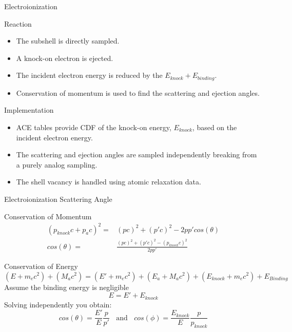 \documentclass{beamer}
\begin{document}
\begin{frame}{Electroionization}

  \begin{block}{Reaction}
    \begin{itemize}
      \item The subshell is directly sampled.
      \item A knock-on electron is ejected.
      \item The incident electron energy is reduced by the $E_{knock} + E_{binding}$.
      \item Conservation of momentum is used to find the scattering and ejection angles.
      \end{itemize}
  \end{block}  
      
  \begin{block}{Implementation}
    \begin{itemize}
      \item ACE tables provide CDF of the knock-on energy, $E_{knock}$, based on the incident electron energy.
      \item The scattering and ejection angles are sampled independently breaking from a purely analog sampling.
      \item The shell vacancy is handled using atomic relaxation data. 
    \end{itemize}
  \end{block}  

\end{frame}

\begin{frame}{Electroionization Scattering Angle}

{\large Conservation of Momentum}
  \begin{align}
    (p_{knock}c + p_{a}c)^2 = & (pc)^2 + (p'c)^2 - 2pp'cos(\theta) \nonumber \\
   cos(\theta) = & \frac{(pc)^2 + (p'c)^2 - (p_{knock}c)^2}{2pp'}  \nonumber
  \end{align}

{\large Conservation of Energy}
  \begin{equation*}
    (E + m_ec^2) + (M_ac^2) =(E' + m_ec^2) + (E_a + M_ac^2) + (E_{knock} + m_ec^2) + E_{Binding}
  \end{equation*}
Assume the binding energy is negligible 
  \begin{equation*}
    E = E' + E_{knock}
  \end{equation*}
  Solving independently you obtain:
  $$ cos(\theta) = \frac{E'}{E}\frac{p}{p'}~~~~\text{and}~~~~
  cos(\phi)=\frac{E_{knock}}{E}\frac{p}{p_{knock}}$$


\end{frame}
\end{document}
